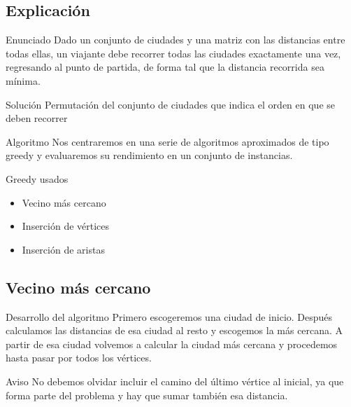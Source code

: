 \subsection{Explicación}
\begin{frame}
	\begin{block}{Enunciado}
	Dado un conjunto de ciudades y una matriz con las distancias entre todas ellas, un 			viajante debe recorrer todas las ciudades exactamente una vez, regresando al punto
	de partida, de forma tal que la distancia recorrida sea mínima.
	\end{block}
	\begin{exampleblock}{Solución}
	Permutación del conjunto de ciudades que indica el orden en que se deben recorrer
	\end{exampleblock}
\end{frame}

\begin{frame}
	\begin{block}{Algoritmo}
	Nos centraremos en una serie de algoritmos aproximados de tipo greedy y evaluaremos
	su rendimiento en un conjunto de instancias.
	\end{block}
	\begin{block}{Greedy usados}
		\begin{itemize}
		\item Vecino más cercano
		\item Inserción de vértices
		\item Inserción de aristas
		\end{itemize}
	\end{block}
\end{frame}

\subsection{Vecino más cercano}
\begin{frame}
	\begin{block}{Desarrollo del algoritmo}
	Primero escogeremos una ciudad de inicio. Después calculamos las distancias de esa
	ciudad al resto y escogemos la más cercana. A partir de esa ciudad volvemos a calcular
	la ciudad más cercana y procedemos hasta pasar por todos los vértices.
	\end{block}

	\begin{alertblock}{Aviso}
	No debemos olvidar incluir el camino del último vértice al inicial, ya que forma parte
	del problema y hay que sumar también esa distancia.
	\end{alertblock}
\end{frame}

